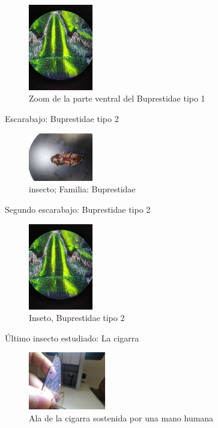 \documentclass[a4paper, twocolumn, 10pt]{article}
\begin{document}
\begin{figure}[H]
    \centering
    \includegraphics[width=0.25\textwidth]{insecto1_abajo.jpg}
    \caption{Zoom de la parte ventral  del Buprestidae tipo 1}
    \label{fig:my_label}
\end{figure}


\noindent Escarabajo: Buprestidae tipo 2


\begin{figure}[H]
    \centering
    \includegraphics[width = 0.25\textwidth]{insecto2_ventral.jpg}
    \caption{insecto; Familia: Buprestidae}
    \label{tipos}
\end{figure}

\noindent Segundo escarabajo: Buprestidae tipo 2

\begin{figure}[H]
    \centering
    \includegraphics[width = 0.25\textwidth]{insecto1_abajo.jpg}
    \caption{Inseto, Buprestidae tipo 2}
    \label{tipos}
\end{figure}
 
\noindent Último insecto estudiado: La cigarra

\begin{figure}[H]
    \centering
    \includegraphics[width = 0.3\textwidth]{ala_dedo.jpg}
    \caption{Ala de la cigarra sostenida por una mano humana}
    \label{tipos}
\end{figure}
 
\end{document}
